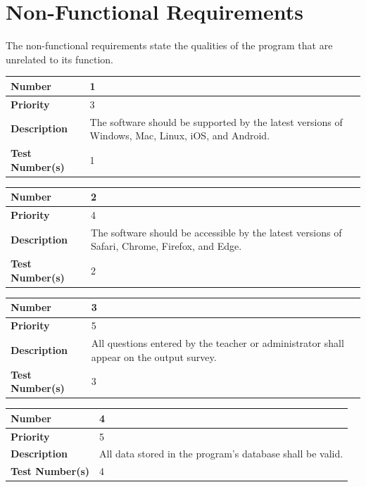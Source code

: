 \documentclass{article}
\begin{document}
\section{Non-Functional Requirements}

The non-functional requirements state the qualities of the program that are unrelated to its function.

\begin{center}
\begin{tabular}{|p{3.5cm}|p{7.5cm}|} 
\hline
\textbf{Number} & 1  \\
\hline
\textbf{Priority} & 3\\ 
\hline
\textbf{Description} & The software should be supported by the latest versions of Windows, Mac, Linux, iOS, and Android. \\ 
\hline
\textbf{Test Number(s) }& 1 \\ 
\hline
\end{tabular}

\bigskip
{}
\begin{tabular}{|p{3.5cm}|p{7.5cm}|} 
\hline
\textbf{Number} & 2  \\
\hline
\textbf{Priority} & 4\\ 
\hline
\textbf{Description} & The software should be accessible by the latest versions of Safari, Chrome, Firefox, and Edge. \\ 
\hline
\textbf{Test Number(s) }& 2 \\ 
\hline
\end{tabular}


\bigskip
{}
\begin{tabular}{|p{3.5cm}|p{7.5cm}|} 
\hline
\textbf{Number} & 3  \\
\hline
\textbf{Priority} & 5\\ 
\hline
\textbf{Description} & All questions entered by the teacher or administrator shall appear on the output survey. \\ 
\hline
\textbf{Test Number(s) }& 3 \\ 
\hline
\end{tabular}


\bigskip
{}
\begin{tabular}{|p{3.5cm}|p{7.5cm}|} 
\hline
\textbf{Number} & 4  \\
\hline
\textbf{Priority} & 5\\ 
\hline
\textbf{Description} & All data stored in the program's database shall be valid. \\ 
\hline
\textbf{Test Number(s) }& 4 \\ 
\hline
\end{tabular}



\end{center}
\end{document}
